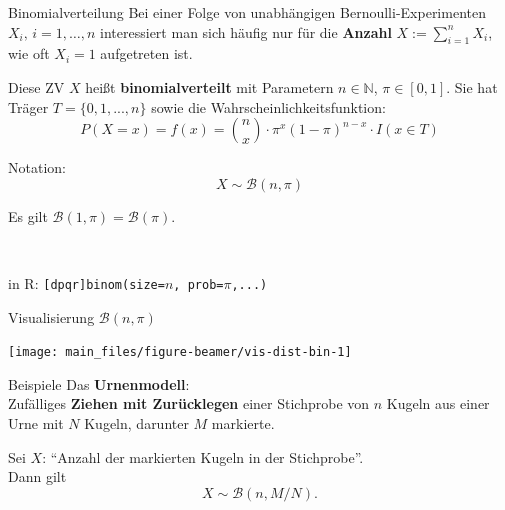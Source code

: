 \documentclass[
  10pt,
  ignorenonframetext,
]{beamer}
\begin{document}
\begin{frame}[fragile]{Binomialverteilung}
\label{binomialverteilung}
Bei einer Folge von unabhängigen Bernoulli-Experimenten
\(X_i,\, i = 1, \dots, n\) interessiert man sich häufig nur für die
\textbf{Anzahl} \(X := \sum_{i=1}^n X_i\), wie oft \(X_i =1\)
aufgetreten ist.~

Diese ZV \(X\) heißt \textbf{binomialverteilt} mit Parametern
\(n \in \mathbb{N}\), \(\pi \in [0, 1]\). Sie hat Träger
\({T} = \{0, 1, ..., n\}\) sowie die Wahrscheinlichkeitsfunktion:
\[P(X = x) = f(x) = {n \choose x} \cdot \pi^x (1-\pi)^{n - x} \cdot I(x \in T)\]

Notation: \[X \sim {\mathcal B}(n, \pi)\]

Es gilt \({\mathcal B}(1, \pi) = {\mathcal B}(\pi)\).\\
\strut ~

in R:
\texttt{{[}dpqr{]}binom(size=}\(n\)\texttt{,\ prob=}\(\pi\)\texttt{,...)}

\end{frame}

\begin{frame}{Visualisierung \({\mathcal B}(n, \pi)\)}
\label{visualisierung-mathcal-bn-pi}
\scriptsize

\begin{center}\texttt{[image: main\_files/figure-beamer/vis-dist-bin-1]} \end{center}

\normalsize
\end{frame}

\begin{frame}{Beispiele}
\label{beispiele-1}
Das \textbf{Urnenmodell}:\\
Zufälliges \textbf{Ziehen mit Zurücklegen} einer Stichprobe von \(n\)
Kugeln aus einer Urne mit \(N\) Kugeln, darunter \(M\) markierte.

Sei \(X\): ``Anzahl der markierten Kugeln in der Stichprobe''.\\
Dann gilt \[ X \sim {\mathcal B}(n, M/N).\]
\end{frame}
\end{document}
